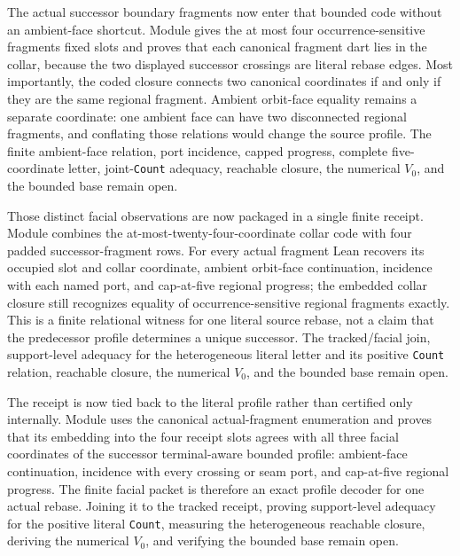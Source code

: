 \documentclass[11pt]{article}
\theoremstyle{definition}
\begin{document}
The actual successor boundary fragments now enter that bounded code without
an ambient-face shortcut.  Module
gives the at most four occurrence-sensitive fragments fixed slots and proves
that each canonical fragment dart lies in the collar, because the two
displayed successor crossings are literal rebase edges.  Most importantly,
the coded closure connects two canonical coordinates if and only if they are
the same regional fragment.  Ambient orbit-face equality remains a separate
coordinate: one ambient face can have two disconnected regional fragments,
and conflating those relations would change the source profile.  The finite
ambient-face relation, port incidence, capped progress, complete
five-coordinate letter, joint-\texttt{Count} adequacy, reachable closure, the
numerical $V_0$, and the bounded base remain open.

Those distinct facial observations are now packaged in a single finite
receipt.  Module
combines the at-most-twenty-four-coordinate collar code with four padded
successor-fragment rows.  For every actual fragment Lean recovers its occupied
slot and collar coordinate, ambient orbit-face continuation, incidence with
each named port, and cap-at-five regional progress; the embedded collar
closure still recognizes equality of occurrence-sensitive regional fragments
exactly.  This is a finite relational witness for one literal source rebase,
not a claim that the predecessor profile determines a unique successor.  The
tracked/facial join, support-level adequacy for the heterogeneous literal
letter and its positive \texttt{Count} relation, reachable closure, the
numerical $V_0$, and the bounded base remain open.

The receipt is now tied back to the literal profile rather than certified only
internally.  Module
uses the canonical actual-fragment enumeration and proves that its embedding
into the four receipt slots agrees with all three facial coordinates of the
successor terminal-aware bounded profile: ambient-face continuation, incidence
with every crossing or seam port, and cap-at-five regional progress.  The
finite facial packet is therefore an exact profile decoder for one actual
rebase.  Joining it to the tracked receipt, proving support-level adequacy for
the positive literal \texttt{Count}, measuring the heterogeneous reachable
closure, deriving the numerical $V_0$, and verifying the bounded base remain
open.
\end{document}
